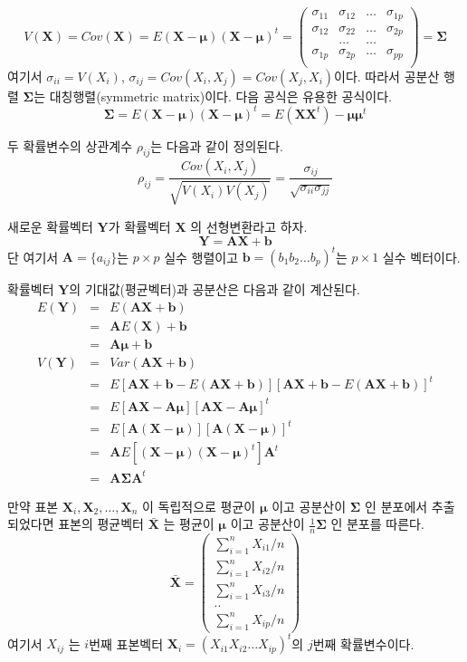 \documentclass[
]{book}
\theoremstyle{definition}
\theoremstyle{definition}
\theoremstyle{definition}
\theoremstyle{remark}
\begin{document}
\begin{equation*}
V(\bm X) =Cov(\bm X) = E (\bm X-\bm \mu) (\bm X-\bm \mu)^t 
= 
  \begin{pmatrix}
\sigma_{11} & \sigma_{12} & \dots & \sigma_{1p} \\
\sigma_{12} & \sigma_{22} & \dots & \sigma_{2p} \\
& \dots & \dots & \\
\sigma_{1p} & \sigma_{2p} & \dots & \sigma_{pp} \\
\end{pmatrix}
= \bm \Sigma
\end{equation*}
여기서 \(\sigma_{ii}=V(X_i)\), \(\sigma_{ij} = Cov(X_i, X_j)=Cov(X_j, X_i)\)이다. 따라서 공분산 행렬
\(\bm \Sigma\)는 대칭행렬(symmetric matrix)이다. 다음 공식은 유용한 공식이다.
\[ \bm \Sigma = E (\bm X-\bm \mu) (\bm X-\bm \mu)^t  = E(\bm X \bm X^t)-\bm \mu \bm \mu^t \]

두 확률변수의 상관계수 \(\rho_{ij}\)는 다음과 같이 정의된다.
\[ \rho_{ij} = \frac{Cov(X_i, X_j)}{ \sqrt{V(X_i) V(X_j)}} = \frac{\sigma_{ij}}{\sqrt{\sigma_{ii}
  \sigma_{jj}}} \]

새로운 확률벡터 \(\bm Y\)가 확률벡터 \(\bm X\) 의 선형변환라고 하자.
\[ \bm Y = \bm A  \bm X + \bm b \]
단 여기서 \(\bm A = \{ a_{ij} \}\)는 \(p \times p\) 실수 행렬이고
\(\bm b =(b_1 b_2 \dots b_p)^t\)는 \(p \times 1\) 실수 벡터이다.

확률벡터 \(\bm Y\)의 기대값(평균벡터)과 공분산은 다음과 같이 계산된다.
\begin{eqnarray*}
E(\bm Y ) &=& E(\bm A \bm X+ \bm b) \\
&=& \bm A E(\bm X)+ \bm b \\
&=& \bm A \bm \mu+ \bm b \\
V(\bm Y) &=& Var(\bm A \bm X+ \bm b) \\
&=& E[\bm A \bm X+ \bm b -E(\bm A \bm X+ \bm b)] [\bm A \bm X+ \bm b -E(\bm A \bm X+ \bm b)]^t \\
&=& E[\bm A \bm X -  \bm A \bm \mu] [\bm A \bm X -  \bm A \bm \mu]^t \\
&=& E[\bm A (\bm X - \bm \mu)] [\bm A (\bm X - \bm \mu)]^t \\
&=& \bm A E [(\bm X - \bm \mu) (\bm X - \bm \mu)^t] \bm A^t \\
&=& \bm A \bm \Sigma \bm A^t
\end{eqnarray*}

만약 표본 \(\bm X_i, \bm X_2, \dots, \bm X_n\) 이 독립적으로 평균이 \(\bm \mu\) 이고 공분산이 \(\bm \Sigma\)
인 분포에서 추출되었다면 표본의 평균벡터 \(\bar {\bm X}\) 는 평균이 \(\bm \mu\) 이고 공분산이 \(\frac{1}{n}\bm \Sigma\)
인 분포를 따른다.
\begin{equation*}
\bar {\bm X} =
  \begin{pmatrix}
\sum_{i=1}^n X_{i1} / n  \\
\sum_{i=1}^n X_{i2} / n \\
\sum_{i=1}^n X_{i3} / n \\
..  \\
\sum_{i=1}^n X_{ip} / n 
\end{pmatrix}
\end{equation*}
여기서 \(X_{ij}\) 는 \(i\)번째 표본벡터 \(\bm X_i =(X_{i1} X_{i2} \dots X_{ip})^t\)의 \(j\)번째 확률변수이다.
\end{document}
